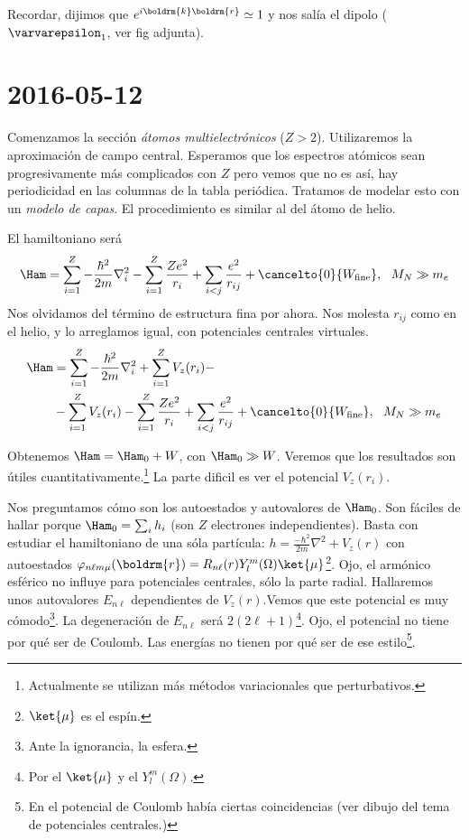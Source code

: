 Recordar, dijimos que $e^{i \boldrm{k} \boldrm{r}} \simeq 1$ y nos salía el
dipolo ($\varvarepsilon_1$, ver fig adjunta).

\section{2016-05-12}

Comenzamos la sección \emph{átomos multielectrónicos} ($Z>2$). Utilizaremos la
aproximación de campo central. Esperamos que los espectros atómicos
sean progresivamente más complicados con $Z$ pero vemos que no es así,
hay periodicidad en las columnas de la tabla periódica. Tratamos de
modelar esto con un \emph{modelo de capas}. El procedimiento es
similar al del átomo de helio.

El hamiltoniano será
\begin{equation}
  \Ham = \sum_{i=1}^Z - \frac{\hbar^2}{2m} \nabla_i^2 - \sum_{i=1}^Z
  \frac{Ze^2}{r_i} + \sum_{i<j} \frac{e^2}{r_{ij}} +
  \cancelto{0}{W_\text{fine}}, \ \ M_N \gg m_e
\end{equation}
Nos olvidamos del término de estructura fina por ahora. Nos molesta
$r_{ij}$ como en el helio, y lo arreglamos igual, con potenciales
centrales virtuales.
\begin{equation}
  \begin{split}
    \Ham &= \sum_{i=1}^Z - \frac{\hbar^2}{2m} \nabla_i^2 + \sum_{i=1}^Z V_z(r_i) - 
    \\
    &-
      \sum_{i=1}^Z V_z(r_i) - \sum_{i=1}^Z
    \frac{Ze^2}{r_i} + \sum_{i<j} \frac{e^2}{r_{ij}} +
    \cancelto{0}{W_\text{fine}}, \ \ M_N \gg m_e 
  \end{split}
\end{equation}

Obtenemos $\Ham = \Ham_0 + W$, con $\Ham_0 \gg W$. Veremos que los
resultados son útiles cuantitativamente.\footnote{Actualmente se
  utilizan más métodos variacionales que perturbativos.}
La parte dificil es ver el potencial $V_z(r_i)$.

Nos preguntamos cómo son los autoestados y autovalores de $\Ham_0$.
Son fáciles de hallar porque $\Ham_0 = \sum_{i}h_i$ (son $Z$
electrones independientes). Basta con estudiar el hamiltoniano de una
sóla partícula: $h = \frac{-\hbar^2}{2m} \nabla^2 + V_z(r)$ con
autoestados $\varphi_{n\ell m
  \mu}(\boldrm{r})=R_{n\ell}(r)Y_l^m(\Omega)\ket{\mu}$\footnote{$\ket{\mu}$ es
  el espín.}. Ojo, el armónico esférico no influye para potenciales
centrales, sólo la parte radial. Hallaremos unos autovalores $E_{n\ell}$
dependientes de $V_z(r)$.Vemos que este potencial es muy cómodo\footnote{Ante la ignorancia, la esfera.}.
La degeneración de $E_{n\ell}$ será $2(2\ell+1)$\footnote{Por el $\ket{\mu}$
  y el $Y_l^m(\Omega)$.}. Ojo, el potencial no tiene
por qué ser de Coulomb. Las energías no tienen por qué ser de ese
estilo\footnote{En el potencial de Coulomb había ciertas
  coincidencias (ver dibujo del tema de potenciales centrales.)}.

